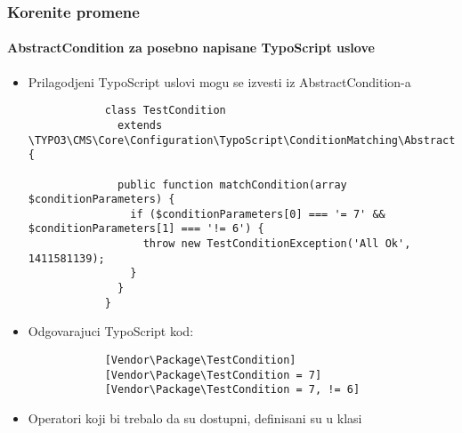 \begin{frame}[fragile]
	\frametitle{Korenite promene}
	\framesubtitle{AbstractCondition za posebno napisane TypoScript uslove}

	\lstset{
		basicstyle=\tiny\ttfamily
	}

	\begin{itemize}
		\item Prilagodjeni TypoScript uslovi mogu se izvesti iz AbstractCondition-a

		\begin{lstlisting}
			class TestCondition
			  extends \TYPO3\CMS\Core\Configuration\TypoScript\ConditionMatching\AbstractCondition {

			  public function matchCondition(array $conditionParameters) {
 			    if ($conditionParameters[0] === '= 7' && $conditionParameters[1] === '!= 6') {
			      throw new TestConditionException('All Ok', 1411581139);
			    }
			  }
			}
		\end{lstlisting}

		\item Odgovarajuci TypoScript kod:

		\begin{lstlisting}
			[Vendor\Package\TestCondition]
			[Vendor\Package\TestCondition = 7]
			[Vendor\Package\TestCondition = 7, != 6]
		\end{lstlisting}

		\item Operatori koji bi trebalo da su dostupni, definisani su u klasi

	\end{itemize}

\end{frame}



